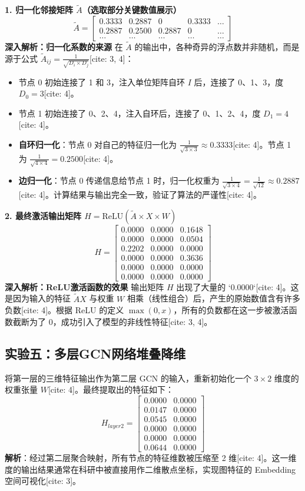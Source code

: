 \documentclass[12pt,a4paper]{article}
\begin{document}
\textbf{1. 归一化邻接矩阵 $\tilde{A}$（选取部分关键数值展示）}
\[
\tilde{A} = \begin{bmatrix}
0.3333 & 0.2887 & 0 & 0.3333 & \dots \\
0.2887 & 0.2500 & 0.2887 & 0 & \dots \\
\dots & \dots & \dots & \dots & \dots
\end{bmatrix}
\]
\textbf{深入解析：归一化系数的来源}
在 $\tilde{A}$ 的输出中，各种奇异的浮点数并非随机，而是源于公式 $\tilde{A}_{ij} = \frac{1}{\sqrt{D_i \times D_j}}$[cite: 3, 4]：
\begin{itemize}
    \item 节点 0 初始连接了 1 和 3，注入单位矩阵自环 $I$ 后，连接了 0、1、3，度 $D_0 = 3$[cite: 4]。
    \item 节点 1 初始连接了 0、2、4，注入自环后，连接了 0、1、2、4，度 $D_1 = 4$[cite: 4]。
    \item \textbf{自环归一化}：节点 0 对自己的特征归一化为 $\frac{1}{\sqrt{3 \times 3}} \approx 0.3333$[cite: 4]。节点 1 为 $\frac{1}{\sqrt{4 \times 4}} = 0.2500$[cite: 4]。
    \item \textbf{边归一化}：节点 0 传递信息给节点 1 时，归一化权重为 $\frac{1}{\sqrt{3 \times 4}} = \frac{1}{\sqrt{12}} \approx 0.2887$[cite: 4]。计算结果与输出完全一致，验证了算法的严谨性[cite: 4]。
\end{itemize}

\textbf{2. 最终激活输出矩阵 $H = \text{ReLU}(\tilde{A} \times X \times W)$}
\[
H = \begin{bmatrix}
0.0000 & 0.0000 & 0.1648 \\
0.0000 & 0.0000 & 0.0504 \\
0.2202 & 0.0000 & 0.0000 \\
0.0000 & 0.0000 & 0.3636 \\
0.0000 & 0.0000 & 0.0000 \\
0.0000 & 0.0000 & 0.0000 
\end{bmatrix}
\]
\textbf{深入解析：ReLU激活函数的效果}
输出矩阵 $H$ 出现了大量的 `0.0000`[cite: 4]。这是因为输入的特征 $\tilde{A}X$ 与权重 $W$ 相乘（线性组合）后，产生的原始数值含有许多负数[cite: 4]。根据 ReLU 的定义 $\max(0, x)$，所有的负数都在这一步被激活函数截断为了 0，成功引入了模型的非线性特征[cite: 3, 4]。

\subsection{实验五：多层GCN网络堆叠降维}

将第一层的三维特征输出作为第二层 GCN 的输入，重新初始化一个 $3\times 2$ 维度的权重张量 $W$[cite: 4]。最终提取出的特征如下：
\[
H_{layer2} = \begin{bmatrix}
0.0000 & 0.0000 \\
0.0147 & 0.0000 \\
0.0545 & 0.0000 \\
0.0000 & 0.0000 \\
0.0000 & 0.0000 \\
0.0644 & 0.0000 
\end{bmatrix}
\]
\textbf{解析}：经过第二层聚合映射，所有节点的特征维数被压缩至 2 维[cite: 4]。这一维度的输出结果通常在科研中被直接用作二维散点坐标，实现图特征的 Embedding 空间可视化[cite: 3]。
\end{document}
